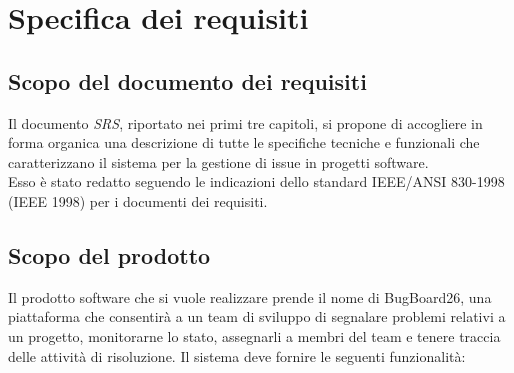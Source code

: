 
\chapter{Specifica dei requisiti} %

\label{Chapter1} %




\section{Scopo del documento dei requisiti}
\label{chap1:sec1:general_information}
Il documento \textit{SRS}, riportato nei primi tre capitoli, si propone di accogliere in forma organica una descrizione di tutte le specifiche tecniche e funzionali che caratterizzano il sistema per la gestione di issue in progetti software. \\
Esso è stato redatto seguendo le indicazioni dello standard IEEE/ANSI 830-1998 (IEEE 1998) per i documenti dei requisiti.

\section{Scopo del prodotto}

Il prodotto software che si vuole realizzare prende il nome di BugBoard26, una piattaforma che consentirà a un team di sviluppo di segnalare problemi relativi a un progetto, monitorarne lo stato, assegnarli a membri del team e tenere traccia delle attività di risoluzione. Il sistema deve fornire le seguenti funzionalità:


